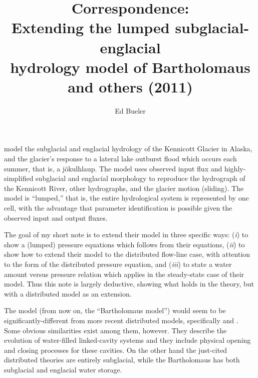 \documentclass[review,letterpaper]{igs}
\begin{document}
\title[Correspondence: Extending the Bartholomaus hydrology model]{Correspondence: \\ Extending the lumped subglacial-englacial \\ hydrology model of Bartholomaus and others (2011)}

\author{Ed Bueler}



\maketitle

\cite{Bartholomausetal2011} model the subglacial and englacial hydrology of the Kennicott Glacier in Alaska, and the glacier's response to a lateral lake outburst flood which occurs each summer, that is, a j\"okulhlaup.  The model uses observed input flux and highly-simplified subglacial and englacial morphology to reproduce the hydrograph of the Kennicott River, other hydrographs, and the glacier motion (sliding).  The model is ``lumped,'' that is, the entire hydrological system is represented by one cell, with the advantage that parameter identification is possible given the observed input and output fluxes.

The goal of my short note is to extend their model in three specific ways: (\emph{i}) to show a (lumped) pressure equations which follows from their equations, (\emph{ii}) to show how to extend their model to the distributed flow-line case, with attention to the form of the distributed pressure equation, and (\emph{iii}) to state a water amount versus pressure relation which applies in the steady-state case of their model.  Thus this note is largely deductive, showing what holds in the \cite{Bartholomausetal2011} theory, but with a distributed model as an extension.

The \cite{Bartholomausetal2011} model (from now on, the ``Bartholomaus model'') would seem to be significantly-different from more recent distributed models, specifically \cite{Schoofetal2012} and \cite{Hewittetal2012}.  Some obvious similarities exist among them, however.  They describe the evolution of water-filled linked-cavity systems and they include physical opening and closing processes for these cavities.  On the other hand the just-cited distributed theories are entirely subglacial, while the Bartholomaus has both subglacial and englacial water storage.  
\end{document}

